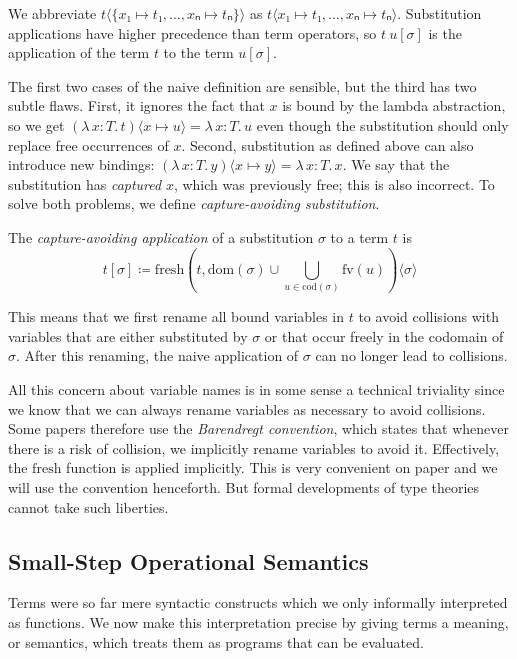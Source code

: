 \documentclass{article}
\theoremstyle{definition}
\newcommand{\fv}{\mathrm{fv}}
\newcommand{\dom}{\mathrm{dom}}
\newcommand{\cod}{\mathrm{cod}}
\newcommand{\fresh}{\mathrm{fresh}}
\newcommand{\Lam}[2]{λ\,#1.\, #2}
\begin{document}
We abbreviate $t⟨\{x₁ ↦ t₁, \dots, xₙ ↦ tₙ\}⟩$ as $t⟨x₁ ↦ t₁, \dots, xₙ ↦ tₙ⟩$.
Substitution applications have higher precedence than term operators, so $t~u[σ]$ is the application of the term $t$ to the term $u[σ]$.

The first two cases of the naive definition are sensible, but the third has two subtle flaws.
First, it ignores the fact that $x$ is bound by the lambda abstraction, so we get $(\Lam{x : T}{t})⟨x ↦ u⟩ = \Lam{x : T}{u}$ even though the substitution should only replace free occurrences of $x$.
Second, substitution as defined above can also introduce new bindings: $(\Lam{x : T}{y})⟨x ↦ y⟩ = \Lam{x : T}{x}$.
We say that the substitution has \emph{captured} $x$, which was previously free; this is also incorrect.
To solve both problems, we define \emph{capture-avoiding substitution}.

\begin{definition}
  The \emph{capture-avoiding application} of a substitution $σ$ to a term $t$ is
  \[
    t[σ] ≔ \fresh(t, \dom(σ) ∪ \bigcup_{u ∈ \cod(σ)} \fv(u))⟨σ⟩
  \]
\end{definition}

This means that we first rename all bound variables in $t$ to avoid collisions with variables that are either substituted by $σ$ or that occur freely in the codomain of $σ$.
After this renaming, the naive application of $σ$ can no longer lead to collisions.

All this concern about variable names is in some sense a technical triviality since we know that we can always rename variables as necessary to avoid collisions.
Some papers therefore use the \emph{Barendregt convention}, which states that whenever there is a risk of collision, we implicitly rename variables to avoid it.
Effectively, the $\fresh$ function is applied implicitly.
This is very convenient on paper and we will use the convention henceforth.
But formal developments of type theories cannot take such liberties.

\subsection{Small-Step Operational Semantics}

Terms were so far mere syntactic constructs which we only informally interpreted as functions.
We now make this interpretation precise by giving terms a meaning, or semantics, which treats them as programs that can be evaluated.
\end{document}
